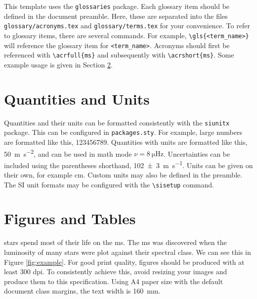 This template uses the \texttt{glossaries} package. Each glossary item should be defined in the document preamble. Here, these are separated into the files \texttt{glossary/acronyms.tex} and \texttt{glossary/terms.tex} for your convenience. To refer to glossary items, there are several commands. For example, \texttt{\textbackslash gls\{<term\_name>\}} will reference the glossary item for \texttt{<term\_name>}. Acronyms should first be referenced with \texttt{\textbackslash acrfull\{ms\}} and subsequently with \texttt{\textbackslash acrshort\{ms\}}. Some example usage is given in Section \ref{sec:figandtab}.

\section{Quantities and Units}

Quantities and their units can be formatted consistently with the \texttt{siunitx} package. This can be configured in \texttt{packages.sty}. For example, large numbers are formatted like this, \num{123456789}. Quantities with units are formatted like this, \SI{50}{\meter\per\second\squared}, and can be used in math mode $\nu = \SI{8}{\micro\hertz}$. Uncertainties can be included using the parentheses shorthand, \SI{102(3)}{\meter\per\second}. Units can be given on their own, for example \si{\centi\meter}. Custom units may also be defined in the preamble. The SI unit formats may be configured with the \texttt{\textbackslash sisetup} command.

\section{Figures and Tables}\label{sec:figandtab}

\Glspl{star} spend most of their life on the \acrfull{ms}. The \acrshort{ms} was discovered when the \gls{luminosity} of many stars were plot against their spectral class. We can see this in Figure \ref{fig:example}. For good print quality, figures should be produced with at least 300 \acrfull{dpi}. To consistently achieve this, avoid resizing your images and produce them to this specification. Using A4 paper size with the default document class margins, the text width is \SI{160}{\milli\meter}.

